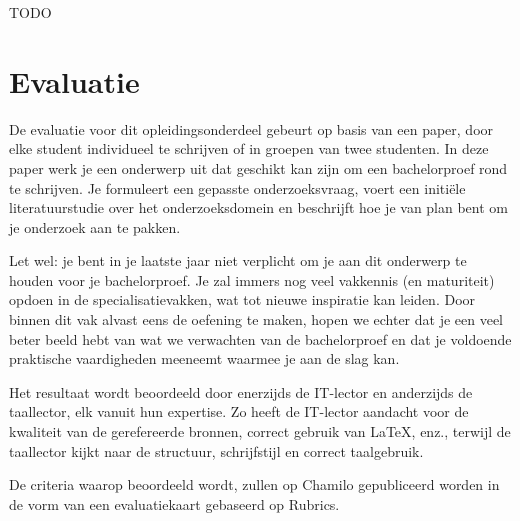 TODO

\section{Evaluatie}
\label{sec:evaluatie}

De evaluatie voor dit opleidingsonderdeel gebeurt op basis van een paper, door elke student individueel te schrijven of in groepen van twee studenten. In deze paper werk je een onderwerp uit dat geschikt kan zijn om een bachelorproef rond te schrijven. Je formuleert een gepasste onderzoeksvraag, voert een initiële literatuurstudie over het onderzoeksdomein en beschrijft hoe je van plan bent om je onderzoek aan te pakken. 

Let wel: je bent in je laatste jaar niet verplicht om je aan dit onderwerp te houden voor je bachelorproef. Je zal immers nog veel vakkennis (en maturiteit) opdoen in de specialisatievakken, wat tot nieuwe inspiratie kan leiden. Door binnen dit vak alvast eens de oefening te maken, hopen we echter dat je een veel beter beeld hebt van wat we verwachten van de bachelorproef en dat je voldoende praktische vaardigheden meeneemt waarmee je aan de slag kan.

Het resultaat wordt beoordeeld door enerzijds de IT-lector en anderzijds de taallector, elk vanuit hun expertise. Zo heeft de IT-lector aandacht voor de kwaliteit van de gerefereerde bronnen, correct gebruik van {\LaTeX}, enz., terwijl de taallector kijkt naar de structuur, schrijfstijl en correct taalgebruik.

De criteria waarop beoordeeld wordt, zullen op Chamilo gepubliceerd worden in de vorm van een evaluatiekaart gebaseerd op Rubrics.
